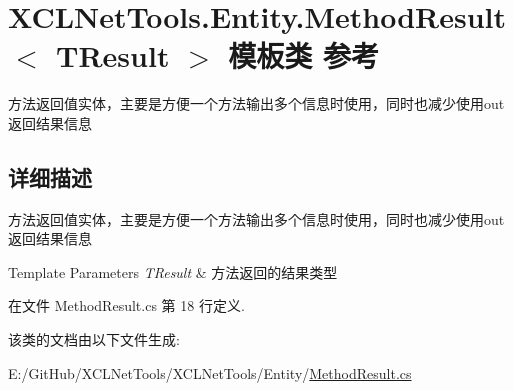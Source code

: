 \hypertarget{class_x_c_l_net_tools_1_1_entity_1_1_method_result}{}\section{X\+C\+L\+Net\+Tools.\+Entity.\+Method\+Result$<$ T\+Result $>$ 模板类 参考}
\label{class_x_c_l_net_tools_1_1_entity_1_1_method_result}


方法返回值实体，主要是方便一个方法输出多个信息时使用，同时也减少使用out返回结果信息  




\subsection{详细描述}
方法返回值实体，主要是方便一个方法输出多个信息时使用，同时也减少使用out返回结果信息 


\begin{DoxyTemplParams}{Template Parameters}
{\em T\+Result} & 方法返回的结果类型\\
\hline
\end{DoxyTemplParams}


在文件 Method\+Result.\+cs 第 18 行定义.



该类的文档由以下文件生成\+:\begin{DoxyCompactItemize}
\item 
E\+:/\+Git\+Hub/\+X\+C\+L\+Net\+Tools/\+X\+C\+L\+Net\+Tools/\+Entity/\hyperlink{_method_result_8cs}{Method\+Result.\+cs}\end{DoxyCompactItemize}
